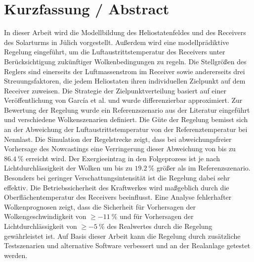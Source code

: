 \chapter*{Kurzfassung / Abstract}
In dieser Arbeit wird die Modellbildung des Heliostatenfeldes und des Receivers des Solarturms in Jülich vorgestellt.
Außerdem wird eine modellprädiktive Regelung eingeführt, um die Luftaustrittstemperatur des Receivers unter Berücksichtigung zukünftiger Wolkenbedingungen zu regeln.
Die Stellgrößen des Reglers sind einerseits der Luftmassenstrom im Receiver sowie andererseits drei Streuungsfaktoren, die jedem Heliostaten ihren individuellen Zielpunkt auf dem Receiver zuweisen.
Die Strategie der Zielpunktverteilung basiert auf einer Veröffentlichung von García et al. \cite{Garcia2} und wurde differenzierbar approximiert.
Zur Bewertung der Regelung wurde ein Referenzszenario aus der Literatur eingeführt und verschiedene Wolkenszenarien definiert.
Die Güte der Regelung bemisst sich an der Abweichung der Luftaustrittstemperatur von der Referenztemperatur bei Nennlast.
Die Simulation der Regelstrecke zeigt, dass bei abweichungsfreier Vorhersage des Nowcastings eine Verringerung dieser Abweichung von bis zu $\SI{86.4}{\percent}$ erreicht wird.
Der Exergieeintrag in den Folgeprozess ist je nach Lichtdurchlässigkeit der Wolken um bis zu $\SI{19.2}{\percent}$ größer als im Referenzszenario.
Besonders bei geringer Verschattungsintensität ist die Regelung dabei sehr effektiv.
Die Betriebssicherheit des Kraftwerkes wird maßgeblich durch die Oberflächentemperatur des Receivers beeinflusst.
Eine Analyse fehlerhafter Wolkenprognosen zeigt, dass die Sicherheit für Vorhersagen der Wolkengeschwindigkeit von $\geq\SI{-11}{\percent}$ und für Vorhersagen der Lichtdurchlässigkeit von $\geq\SI{-5}{\percent}$ des Realwertes durch die Regelung gewährleistet ist.
Auf Basis dieser Arbeit kann die Regelung durch zusätzliche Testszenarien und alternative Software verbessert und an der Realanlage getestet werden.

